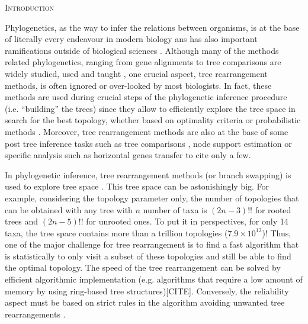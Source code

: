 \documentclass[12pt,letterpaper]{article}
\renewcommand{\section}[1]{%
\bigskip
\begin{center}
\begin{Large}
\normalfont\scshape #1
\medskip
\end{Large}
\end{center}}
\begin{document}
\section{Introduction}

Phylogenetics, as the way to infer the relations between organisms, is at the base of literally every endeavour in modern biology ans has also important ramifications outside of biological sciences \citep[e.g. linguistics;][]{Bouckaert24082012}.
Although many of the methods related phylogenetics, ranging from gene alignments \citep[e.g.][]{Tan01092015} to tree comparisons \citep[e.g.][]{kuhner2015treComparison} are widely studied, used and taught \citep{desalle2012phylogenomics}, one crucial aspect, tree rearrangement methods, is often ignored or over-looked by most biologists.
In fact, these methods are used during crucial steps of the phylogenetic inference procedure (i.e. ``building'' the trees) since they allow to efficiently explore the tree space \citep[see ][]{Sanderson448} in search for the best topology, whether based on optimality criteria \citep[e.g. maximum parsimony; ][]{swofford2003paup} or probabilistic methods \citep[e.g. likelihood or Bayesian; ][]{Stamatakis21012014,Ronquist2012mrbayes}.
Moreover, tree rearrangement methods are also at the base of some post tree inference tasks such as tree comparisons \citep[e.g.][]{allen2001subtree,kuhner2015treComparison}, node support estimation \citep[e.g][]{goloboff2014bias} or specific analysis such as horizontal genes transfer \citep[e.g.][]{mcfadden1995something,bordewich2005computational} to cite only a few.

In phylogenetic inference, tree rearrangement methods (or branch swapping) is used to explore tree space \citep[i.e. the realm of all the possible trees][]{page1993islands,morrison2007increasing,Sanderson448}.
This tree space can be astonishingly big.
For example, considering the topology parameter only, the number of topologies that can be obtained with any tree with $n$ number of taxa is $(2n-3)!!$ for rooted trees and $(2n-5)!!$ for unrooted ones.
To put it in perspectives, for only 14 taxa, the tree space contains more than a trillion topologies ($7.9\times10^{12}$)!
Thus, one of the major challenge for tree rearrangement is to find a fast algorithm that is statistically to only visit a subset of these topologies and still be able to find the optimal topology. 
The speed of the tree rearrangement can be solved by efficient algorithmic implementation (e.g. algorithms that require a low amount of memory by using ring-based tree structures)[CITE].
Conversely, the reliability aspect must be based on strict rules in the algorithm avoiding unwanted tree rearrangements \citep{allen2001subtree,felsenstein2004inferring,lakner2008efficiency,goloboff1993character}.
\end{document}
